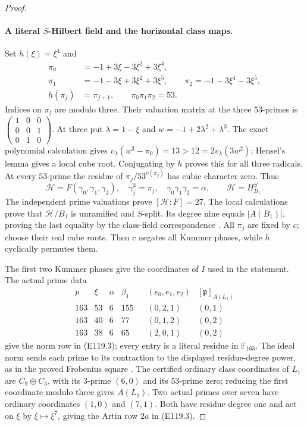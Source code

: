 \begin{proof}
\paragraph{A literal $S$-Hilbert field and the horizontal class maps.}
Set $h(\xi)=\xi^4$ and
\[
 \begin{aligned}
 \pi_0&=-1+3\xi-3\xi^2+3\xi^4,\\
 \pi_1&=-1-3\xi+3\xi^2+3\xi^5,\qquad
 \pi_2=-1-3\xi^4-3\xi^5,\\
 h(\pi_j)&=\pi_{j+1},\qquad \pi_0\pi_1\pi_2=53.
 \end{aligned}
 \tag{E119.11}
\]
Indices on $\pi_j$ are modulo three. Their valuation matrix
at the three $53$-primes is
$\left(\begin{smallmatrix}1&0&0\\0&0&1\\0&1&0\end{smallmatrix}\right)$.
At three put $\lambda=1-\xi$ and
$w=-1+2\lambda^2+\lambda^3$.
The exact polynomial calculation gives
$v_\lambda(w^3-\pi_0)=13>12=2v_\lambda(3w^2)$;
Hensel's lemma gives a local cube root. Conjugating by $h$
proves this for all three radicals. At every $53$-prime the
residue of $\pi_j/53^{v(\pi_j)}$ has cubic character zero.
Thus
\[
 \mathcal H=F(\gamma_0,\gamma_1,\gamma_2),\quad
 \gamma_j^3=\pi_j,\quad \gamma_0\gamma_1\gamma_2=\alpha,
 \qquad \mathcal H=H^S_{B_1}.
 \tag{E119.12}
\]
The independent prime valuations prove $[\mathcal H:F]=27$.
The local calculations prove that $\mathcal H/B_1$ is unramified
and $S$-split. Its degree nine equals $|A(B_1)|$, proving the
last equality by the class-field correspondence
\cite[V,Theorem3.6 and Example3.9]{E_MilneCFT}.
All $\pi_j$ are fixed by $c$; choose their real cube roots.
Then $c$ negates all Kummer phases, while $h$ cyclically permutes them.

The first two Kummer phases give the coordinates of $I$ used
in the statement. The actual prime data
\[
 \begin{array}{c|rrrr|c|c}
 p&\xi&\alpha&\beta_1&& (e_0,e_1,e_2)&[\mathfrak p]_{A(L_1)}\\ \hline
 163&53&6&155&& (0,2,1)&(0,1)\\
 163&40&6&77 && (0,1,2)&(0,2)\\
 163&38&6&65 && (2,0,1)&(0,2)
 \end{array}
 \tag{E119.13}
\]
give the norm row in (E119.3); every entry is a literal
residue in $\mathbb F_{163}$. The ideal norm sends each prime
to its contraction to the displayed residue-degree power, as
in the proved Frobenius square
\cite[V,Proposition3.3]{E_MilneCFT}.
The certified ordinary class coordinates of $L_1$ are
$C_9\oplus C_3$, with its $3$-prime $(6,0)$ and its
$53$-prime zero; reducing the first coordinate modulo three
gives $A(L_1)$. Two actual primes over seven have ordinary
coordinates $(1,0)$ and $(7,1)$. Both have residue degree one
and act on $\xi$ by $\xi\mapsto\xi^7$, giving the Artin
row $2a$ in (E119.3).


\end{proof}
